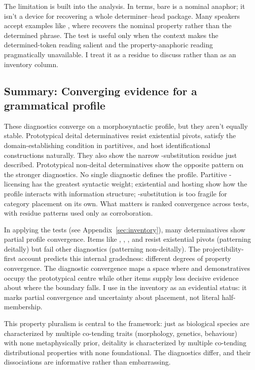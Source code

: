 \documentclass[12pt,letterpaper]{article}
\begin{document}
The limitation is built into the analysis. In \CGEL{} terms, bare  is a nominal anaphor; it isn't a device for recovering a whole determiner--head package. Many speakers accept examples like , where  recovers the nominal property rather than the determined phrase. The test is useful only when the context makes the determined-token reading salient and the property-anaphoric reading pragmatically unavailable. I treat it as a residue to discuss rather than as an inventory column.

\subsection{Summary: Converging evidence for a grammatical profile}

These diagnostics converge on a morphosyntactic profile, but they aren't equally stable. Prototypical deital determinatives resist existential pivots, satisfy the domain-establishing  condition in partitives, and host identificational constructions naturally. They also show the narrow -substitution residue just described. Prototypical non-deital determinatives show the opposite pattern on the stronger diagnostics. No single diagnostic defines the profile. Partitive -licensing has the greatest syntactic weight; existential  and hosting show how the profile interacts with information structure; -substitution is too fragile for category placement on its own. What matters is ranked convergence across tests, with residue patterns used only as corroboration.

In applying the tests (see Appendix~\ref{sec:inventory}), many determinatives show partial profile convergence. Items like , , , and  resist existential pivots (patterning deitally) but fail other diagnostics (patterning non-deitally). The projectibility-first account predicts this internal gradedness: different degrees of property convergence. The diagnostic convergence maps a space where  and demonstratives occupy the prototypical centre while other items supply less decisive evidence about where the boundary falls. I use  in the inventory as an evidential status: it marks partial convergence and uncertainty about placement, not literal half-membership.

This property pluralism is central to the framework: just as biological species are characterized by multiple co-tending traits (morphology, genetics, behaviour) with none metaphysically prior, deitality is characterized by multiple co-tending distributional properties with none foundational. The diagnostics differ, and their dissociations are informative rather than embarrassing.
\end{document}
